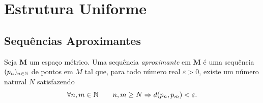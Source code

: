 \section{Estrutura Uniforme}

\subsection{Sequências Aproximantes}

\begin{defi}
Seja $\bm M$ um espaço métrico. Uma sequência \emph{aproximante} em $\bm M$ é uma sequência $(p_n)_{n \in \mathbb{N}}$ de pontos em $M$ tal que, para todo número real $\varepsilon > 0$, existe um número natural $N$ satisfazendo
	\begin{equation*}
	\forall n,m \in \mathbb{N} \qquad n,m \geq N \Rightarrow d(p_n,p_m) < \varepsilon.
	\end{equation*}
\end{defi}

